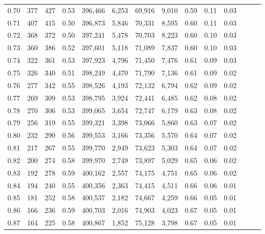 \begin{tabular}{rrrrrrrrrrrrrr}
0.70 &     377 &    427 &  0.53 &  396,466 &    6,253 &  69,916 &   9,010 &  0.59 &  0.11 &      0.03 \\
0.71 &     407 &    415 &  0.50 &  396,873 &    5,846 &  70,331 &   8,595 &  0.60 &  0.11 &      0.03 \\
0.72 &     368 &    372 &  0.50 &  397,241 &    5,478 &  70,703 &   8,223 &  0.60 &  0.10 &      0.03 \\
0.73 &     360 &    386 &  0.52 &  397,601 &    5,118 &  71,089 &   7,837 &  0.60 &  0.10 &      0.03 \\
0.74 &     322 &    361 &  0.53 &  397,923 &    4,796 &  71,450 &   7,476 &  0.61 &  0.09 &      0.03 \\
0.75 &     326 &    340 &  0.51 &  398,249 &    4,470 &  71,790 &   7,136 &  0.61 &  0.09 &      0.02 \\
0.76 &     277 &    342 &  0.55 &  398,526 &    4,193 &  72,132 &   6,794 &  0.62 &  0.09 &      0.02 \\
0.77 &     269 &    309 &  0.53 &  398,795 &    3,924 &  72,441 &   6,485 &  0.62 &  0.08 &      0.02 \\
0.78 &     270 &    306 &  0.53 &  399,065 &    3,654 &  72,747 &   6,179 &  0.63 &  0.08 &      0.02 \\
0.79 &     256 &    319 &  0.55 &  399,321 &    3,398 &  73,066 &   5,860 &  0.63 &  0.07 &      0.02 \\
0.80 &     232 &    290 &  0.56 &  399,553 &    3,166 &  73,356 &   5,570 &  0.64 &  0.07 &      0.02 \\
0.81 &     217 &    267 &  0.55 &  399,770 &    2,949 &  73,623 &   5,303 &  0.64 &  0.07 &      0.02 \\
0.82 &     200 &    274 &  0.58 &  399,970 &    2,749 &  73,897 &   5,029 &  0.65 &  0.06 &      0.02 \\
0.83 &     192 &    278 &  0.59 &  400,162 &    2,557 &  74,175 &   4,751 &  0.65 &  0.06 &      0.02 \\
0.84 &     194 &    240 &  0.55 &  400,356 &    2,363 &  74,415 &   4,511 &  0.66 &  0.06 &      0.01 \\
0.85 &     181 &    252 &  0.58 &  400,537 &    2,182 &  74,667 &   4,259 &  0.66 &  0.05 &      0.01 \\
0.86 &     166 &    236 &  0.59 &  400,703 &    2,016 &  74,903 &   4,023 &  0.67 &  0.05 &      0.01 \\
0.87 &     164 &    225 &  0.58 &  400,867 &    1,852 &  75,128 &   3,798 &  0.67 &  0.05 &      0.01 \\

\end{tabular}
